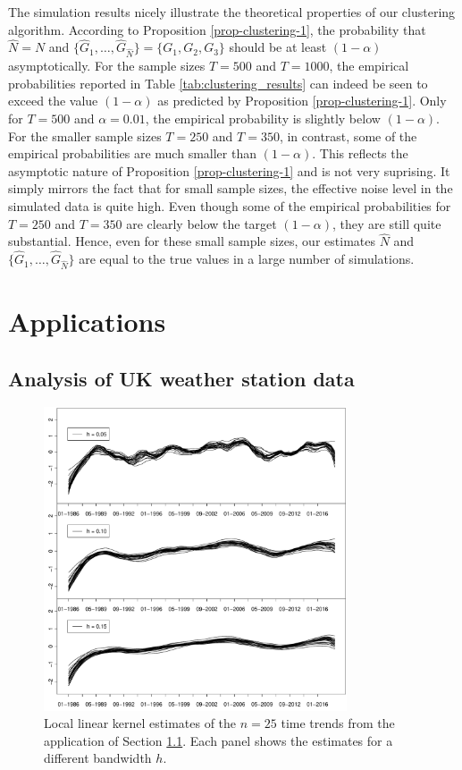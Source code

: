 The simulation results nicely illustrate the theoretical properties of our clustering algorithm. According to Proposition \ref{prop-clustering-1}, the probability that $\widehat{N} = N$ and $\{ \widehat{G}_1,\ldots,\widehat{G}_{\widehat{N}}\} = \{G_1,G_2,G_3\}$ should be at least $(1-\alpha)$ asymptotically. For the sample sizes $T = 500$ and $T = 1000$, the empirical probabilities reported in Table \ref{tab:clustering_results} can indeed be seen to exceed the value $(1-\alpha)$ as predicted by Proposition \ref{prop-clustering-1}. Only for $T = 500$ and $\alpha = 0.01$, the empirical probability is slightly below $(1-\alpha)$. For the smaller sample sizes $T=250$ and $T=350$, in contrast, some of the empirical probabilities are much smaller than $(1-\alpha)$. This reflects the asymptotic nature of Proposition \ref{prop-clustering-1} and is not very suprising. It simply mirrors the fact that for small sample sizes, the effective noise level in the simulated data is quite high. Even though some of the empirical probabilities for $T=250$ and $T=350$ are clearly below the target $(1-\alpha)$, they are still quite substantial. Hence, even for these small sample sizes, our estimates $\widehat{N}$ and $\{ \widehat{G}_1,\ldots,\widehat{G}_{\widehat{N}} \}$ are equal to the true values in a large number of simulations. 

\section{Applications}\label{sec-data}
\subsection{Analysis of UK weather station data}\label{subsec-data-2} 


\begin{figure}[t]
\centering
\includegraphics[width=0.8\textwidth]{Plots/stations_data.pdf}
\vspace{0.2cm}
\caption{Local linear kernel estimates of the $n=25$ time trends from the application of Section \ref{subsec-data-2}. Each panel shows the estimates for a different bandwidth $h$.}\label{plot-results-app2}
\end{figure}


